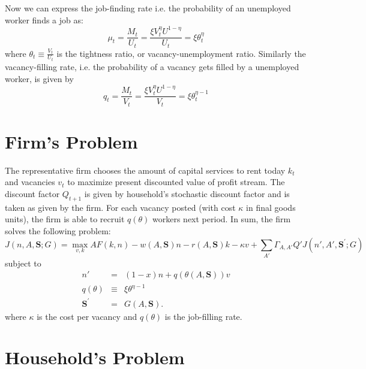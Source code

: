\documentclass[12pt]{article}
\begin{document}
Now we can express the job-finding rate i.e. the probability of an unemployed worker finds a job as:
\[
\mu_{t} = \frac{M_{t}}{U_{t}}=\frac{\xi V_{t}^{\eta} U^{1-\eta}}{U_{t}} = \xi \theta_{t}^{\eta}
\]
\noindent where $\theta_{t} \equiv \frac{V_{t}}{U_{t}}$ is the tightness ratio, or vacancy-unemployment ratio. Similarly the vacancy-filling rate, i.e. the probability of a vacancy gets filled by a unemployed worker, is given by
\[
q_{t} = \frac{M_{t}}{V_{t}} = \frac{\xi V_{t}^{\eta} U^{1-\eta}}{V_{t}} = \xi \theta_{t}^{\eta -1}
\]

\section{Firm's Problem}
The representative firm chooses the amount of capital services to rent today $k_{t}$ and vacancies $v_{t}$ to maximize present discounted value of profit stream. The discount factor $Q_{t+1}$ is given by household's stochastic discount factor and is taken as given by the firm. For each vacancy posted (with cost $\kappa$ in final goods units), the firm is able to recruit $q(\theta)$ workers next period. In sum, the firm solves the following problem:
	\begin{equation}
	J(n,A,\mathbf{S};G) = \max_{v,k} AF(k,n) - w(A,\mathbf{S})n - r(A,\mathbf{S})k - \kappa v + \sum_{A'} \Gamma_{A,A'} Q'J(n',A',\mathbf{S}^{\prime};G)
	\end{equation}
	subject to
	\begin{eqnarray}
	n' &=& (1-x)n + q(\theta(A,\mathbf{S}))v \\
	q(\theta) &\equiv& \xi \theta^{\eta-1} \\
	\mathbf{S}^{\prime} &=& G(A,\mathbf{S}).
	\end{eqnarray}
	where $\kappa$ is the cost per vacancy and $q(\theta)$ is the job-filling rate.

\section{Household's Problem}
\end{document}
